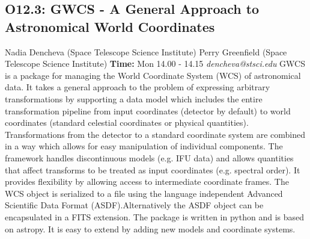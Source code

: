 \documentclass{report}
\begin{document}
\subsection*{O12.3: GWCS - A General Approach to  Astronomical World Coordinates}
\bigskip
Nadia Dencheva (Space Telescope Science Institute) \newline Perry Greenfield (Space Telescope Science Institute) \newline   \newline   \newline  \newline  \newline\newline
{\bf Time:} Mon 14.00 - 14.15\newline
\newline
{\it dencheva@stsci.edu}\newline
\newline\newline
GWCS is a package for managing the World Coordinate System (WCS) of astronomical data.
It takes a general approach to the problem of expressing arbitrary transformations
 by supporting a data model which includes the entire transformation pipeline from input 
coordinates (detector by default) to world coordinates (standard celestial coordinates or physical quantities).
Transformations from the detector to a standard coordinate system are combined in a way which allows for easy 
manipulation of individual components. The framework handles 
discontinuous models (e.g. IFU data) and allows quantities that affect transforms to be treated as input 
coordinates (e.g. spectral order). It provides flexibility by allowing access to intermediate coordinate frames. 
The WCS object is serialized to a file using the language independent 
Advanced Scientific Data Format (ASDF).Alternatively the ASDF object can be encapsulated in a FITS extension.
The package is written in python and is based on astropy. It is easy to extend by 
adding new models and coordinate systems.\newline
\newpage
\end{document}
